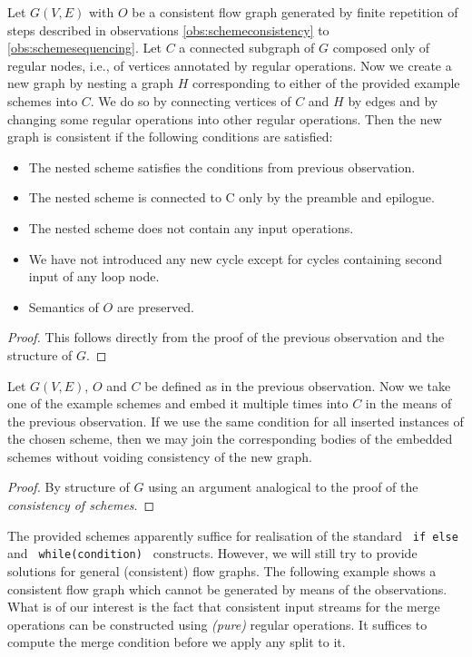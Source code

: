   Let $G(V,E)$ with $O$ be a consistent flow graph generated by finite repetition of steps described in observations \ref{obs:schemeconsistency} to \ref{obs:schemesequencing}. Let $C$ a connected subgraph of $G$ composed only of regular nodes, i.e., of vertices annotated by regular operations. Now we create a new graph by nesting a graph $H$ corresponding to either of the provided example schemes into $C$. We do so by connecting vertices of $C$ and $H$ by edges and by changing some regular operations into other regular operations. Then the new graph is consistent if the following conditions are satisfied:
  \begin{itemize}
    \item The nested scheme satisfies the conditions from previous observation.
    \item The nested scheme is connected to C only by the preamble and epilogue.
    \item The nested scheme does not contain any input operations. 
    \item We have not introduced any new cycle except for cycles containing second input of any loop node.
    \item Semantics of $O$ are preserved.
  \end{itemize}
  \begin{proof} 
    This follows directly from the proof of the previous observation and the structure of $G$.
  \end{proof}
\myendobs

  Let $G(V,E)$, $O$ and $C$ be defined as in the previous observation. Now we take one of the example schemes and embed it multiple times into $C$ in the means of the previous observation. If we use the same condition for all inserted instances of the chosen scheme, then we may join the corresponding bodies of the embedded schemes without voiding consistency of the new graph.
  \begin{proof} 
    By structure of $G$ using an argument analogical to the proof of the \emph{consistency of schemes}.
  \end{proof}
\myendobs


The provided schemes apparently suffice for realisation of the standard \texttt{ if \string{\string} else \string{\string} } and \texttt{ while(condition) \string{\string} } constructs. However, we will still try to provide solutions for general (consistent) flow graphs. The following example shows a consistent flow graph which cannot be generated by means of the observations. What is of our interest is the fact that consistent input streams for the merge operations can be constructed using \emph{(pure)} regular operations. It suffices to compute the merge condition before we apply any split to it.

